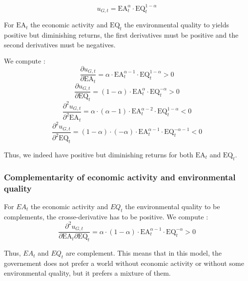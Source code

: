 \documentclass{article}
\begin{document}
\begin{equation*}
    u_{G,t}=\text{EA}_{t}^{\alpha}\cdot\text{EQ}_{t}^{1-\alpha}
\end{equation*}

For $\text{EA}_{t}$ the economic activity and $\text{EQ}_{t}$ the environmental quality to yields positive but diminishing returns, the first derivatives must be positive and the second derivatives must be negatives. 

We compute : 
$$\frac{\partial u_{G,t}}{\partial \text{EA}_{t}}=\alpha\cdot\text{EA}_{t}^{\alpha-1}\cdot\text{EQ}_{t}^{1-\alpha}>0$$
$$\frac{\partial u_{G,t}}{\partial \text{EQ}_{t}}=(1-\alpha)\cdot\text{EA}_{t}^{\alpha}\cdot\text{EQ}_{t}^{-\alpha}>0$$
$$\frac{\partial^2 u_{G,t}}{\partial^2 \text{EA}_{t}}=\alpha\cdot(\alpha-1)\cdot\text{EA}_{t}^{\alpha-2}\cdot\text{EQ}_{t}^{1-\alpha}<0$$
$$\frac{\partial^2 u_{G,t}}{\partial^2 \text{EQ}_{t}}=(1-\alpha)\cdot(-\alpha)\cdot\text{EA}_{t}^{\alpha-1}\cdot\text{EQ}_{t}^{-\alpha-1}<0$$

Thus, we indeed have positive but diminishing returns for both $\text{EA}_{t}$ and $\text{EQ}_{t}$.

\subsubsection{Complementarity of economic activity and environmental quality}
\label{sec:properties_utility_function_gov_2}

For $EA_{t}$ the economic activity and $EQ_{t}$ the environmental quality to be complements, the crosse-derivative has to be positive. 
We compute :  
$$\frac{\partial^2 u_{G,t}}{\partial \text{EA}_{t} \partial \text{EQ}_{t}}=\alpha\cdot(1-\alpha)\cdot\text{EA}_{t}^{\alpha-1}\cdot\text{EQ}_{t}^{-\alpha}>0$$

Thus, $EA_{t}$ and $EQ_{t}$ are complement. This means that in this model, the governement does not prefer a world without economic activity or without some environmental quality, but it prefers a mixture of them. 
\end{document}
